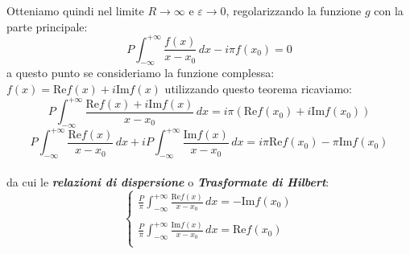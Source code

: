 Otteniamo quindi nel limite $R\to \infty $ e $\varepsilon\to0$, regolarizzando la funzione $g$ con la parte principale:
\[P\int_{-\infty}^{+\infty}\frac{f(x)}{x-x_0}\, dx - i\pi f(x_0) = 0\]
\newline
a questo punto se consideriamo la funzione complessa: $f(x) = \text{Re}f(x) + i\text{Im}f(x)$ utilizzando questo teorema ricaviamo:
\[P\int_{-\infty}^{+\infty}\frac{\text{Re}f(x) + i\text{Im}f(x)}{x-x_0}\, dx = i\pi(\text{Re}f(x_0) + i\text{Im}f(x_0))\]
\[P\int_{-\infty}^{+\infty}\frac{\text{Re}f(x)}{x-x_0}\, dx + iP\int_{-\infty}^{+\infty}\frac{\text{Im}f(x)}{x-x_0}\, dx = i\pi\text{Re}f(x_0) -\pi\text{Im}f(x_0)\]
\\da cui le \textbf{\emph{relazioni di dispersione}} o \textbf{\emph{Trasformate di Hilbert}}:
\[\begin{cases}
    \displaystyle\frac{P}{\pi}\int_{-\infty}^{+\infty}\frac{\text{Re}f(x)}{x-x_0}\, dx =  -\text{Im}f(x_0)   \\ \\
   \displaystyle\frac{P}{\pi}\int_{-\infty}^{+\infty}\frac{\text{Im}f(x)}{x-x_0}\, dx = \text{Re}f(x_0)\\
  \end{cases} \]
